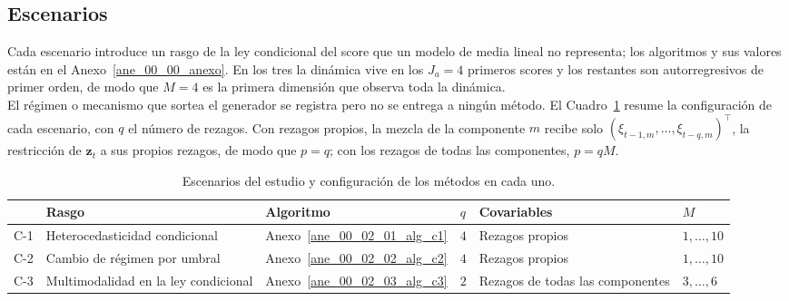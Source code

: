 \subsection{Escenarios}
\label{03_07_02_escenarios}

Cada escenario introduce un rasgo de la ley condicional del score que un modelo de media lineal no representa; los algoritmos y sus valores están en el Anexo~\ref{ane_00_00_anexo}. En los tres la dinámica vive en los $J_a = 4$ primeros scores y los restantes son autorregresivos de primer orden, de modo que $M = 4$ es la primera dimensión que observa toda la dinámica.\\

El régimen o mecanismo que sortea el generador se registra pero no se entrega a ningún método. El Cuadro~\ref{tab:dis_escenarios} resume la configuración de cada escenario, con $q$ el número de rezagos. Con rezagos propios, la mezcla de la componente $m$ recibe solo $(\xi_{t-1,m}, \dots, \xi_{t-q,m})^\top$, la restricción de $\mathbf{z}_t$ a sus propios rezagos, de modo que $p = q$; con los rezagos de todas las componentes, $p = qM$.

\begin{table}[H]
\centering\small
\caption{Escenarios del estudio y configuración de los métodos en cada uno.}
\label{tab:dis_escenarios}
\begin{tabular}{p{} p{} p{} p{} p{} p{}}
\hline
 & Rasgo & Algoritmo & $q$ & Covariables & $M$ \\
\hline
C-1 & Heterocedasticidad condicional        & Anexo~\ref{ane_00_02_01_alg_c1} & $4$ & Rezagos propios                       & $1,\ldots,10$ \\
C-2 & Cambio de régimen por umbral          & Anexo~\ref{ane_00_02_02_alg_c2} & $4$ & Rezagos propios                       & $1,\ldots,10$ \\
C-3 & Multimodalidad en la ley condicional  & Anexo~\ref{ane_00_02_03_alg_c3} & $2$ & Rezagos de todas las componentes      & $3,\ldots,6$ \\
\hline
\end{tabular}
\end{table}

